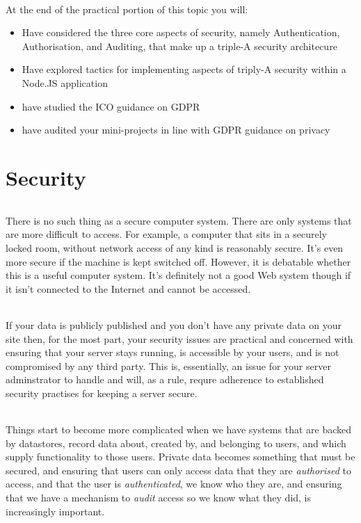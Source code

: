 \documentclass[10pt, a4paper, twosize]{article}
\begin{document}
\paragraph{} At the end of the practical portion of this topic you will:

\begin{itemize}
\item Have considered the three core aspects of security, namely Authentication, Authorisation, and Auditing, that make up a triple-A security architecure
\item Have explored tactics for implementing aspects of triply-A security within a Node.JS application
\item have studied the ICO guidance on GDPR
\item have audited your mini-projects in line with GDPR guidance on privacy 
\end{itemize}

\clearpage
\part{Security}
\paragraph{} There is no such thing as a secure computer system. There are only systems that are more difficult to access. For example, a computer that sits in a securely locked room, without network access of any kind is reasonably secure. It's even more secure if the machine is kept switched off. However, it is debatable whether this is a useful computer system. It's definitely not a good Web system though if it isn't connected to the Internet and cannot be accessed.

\paragraph{} If your data is publicly published and you don't have any private data on your site then, for the most part, your security issues are practical and concerned with ensuring that your server stays running, is accessible by your users, and is not compromised by any third party. This is, essentially, an issue for your server adminstrator to handle and will, as a rule, requre adherence to established security practises for keeping a server secure.

\paragraph{} Things start to become more complicated when we have systems that are backed by datastores, record data about, created by, and belonging to users, and which supply functionality to those users. Private data becomes something that must be secured, and ensuring that users can only access data that they are \emph{authorised} to access, and that the user is \emph{authenticated}, we know who they are, and ensuring that we have a mechanism to \emph{audit} access so we know what they did, is increasingly important.
\end{document}
